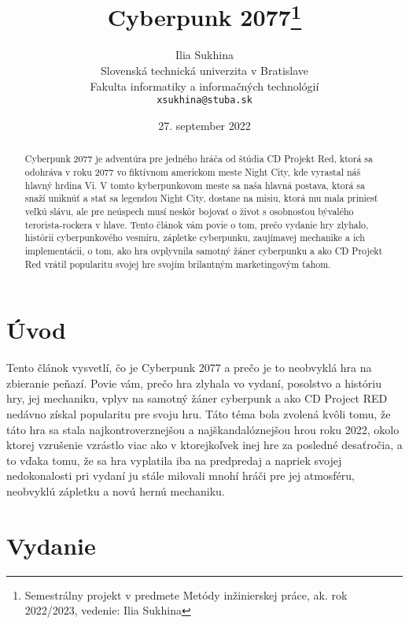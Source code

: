 \documentclass[10pt,twoside,slovak,a4paper]{article}
\title{Cyberpunk 2077\thanks{Semestrálny projekt v predmete Metódy inžinierskej práce, ak. rok 2022/2023, vedenie: Ilia Sukhina}} %
\author{Ilia Sukhina\\[2pt]
	{\small Slovenská technická univerzita v Bratislave}\\
	{\small Fakulta informatiky a informačných technológií}\\
	{\small \texttt{xsukhina@stuba.sk}}
	}
\date{\small 27. september 2022} %
\begin{document}
\maketitle

\begin{abstract}
	Cyberpunk 2077 je adventúra pre jedného hráča od štúdia CD Projekt Red, ktorá sa odohráva v roku 2077 vo fiktívnom americkom meste Night City, kde vyrastal náš hlavný hrdina Vi. V tomto kyberpunkovom meste sa naša hlavná postava, ktorá sa snaží uniknúť a stať sa legendou Night City, dostane na misiu, ktorá mu mala priniesť veľkú slávu, ale pre neúspech musí neskôr bojovať o život s osobnosťou bývalého terorista-rockera v hlave. Tento článok vám povie o tom, prečo vydanie hry zlyhalo, histórii cyberpunkového vesmíru, zápletke cyberpunku, zaujímavej mechanike a ich implementácii, o tom, ako hra ovplyvnila samotný žáner cyberpunku a ako CD Projekt Red vrátil popularitu svojej hre svojím brilantným marketingovým ťahom.
\end{abstract}



\section{Úvod}

Tento článok vysvetlí, čo je Cyberpunk 2077 a prečo je to neobvyklá hra na zbieranie peňazí. Povie vám, prečo hra zlyhala vo vydaní, posolstvo a históriu hry, jej mechaniku, vplyv na samotný žáner cyberpunk a ako CD Project RED nedávno získal popularitu pre svoju hru. Táto téma bola zvolená kvôli tomu, že táto hra sa stala najkontroverznejšou a najškandalóznejšou hrou roku 2022, okolo ktorej vzrušenie vzrástlo viac ako v ktorejkoľvek inej hre za posledné desaťročia, a to vďaka tomu, že sa hra vyplatila iba na predpredaj a napriek svojej nedokonalosti pri vydaní ju stále milovali mnohí hráči pre jej atmosféru, neobvyklú zápletku a novú hernú mechaniku.


\section{Vydanie} \label{vydanie}
\end{document}

